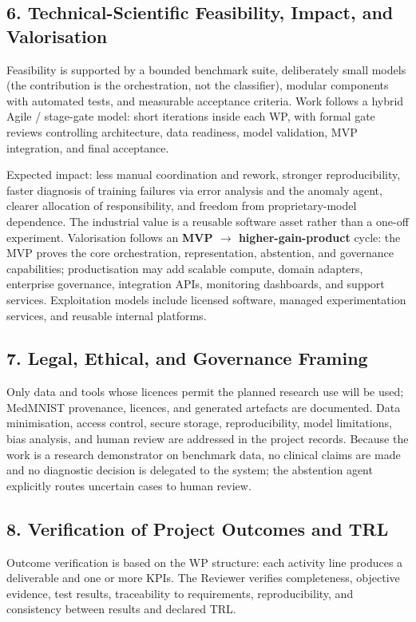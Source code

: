 \documentclass[11pt,a4paper]{article}
\begin{document}
\subsection*{6. Technical-Scientific Feasibility, Impact, and Valorisation}
Feasibility is supported by a bounded benchmark suite, deliberately small models (the contribution is the orchestration, not the classifier), modular components with automated tests, and measurable acceptance criteria. Work follows a hybrid Agile / stage-gate model: short iterations inside each WP, with formal gate reviews controlling architecture, data readiness, model validation, MVP integration, and final acceptance.

Expected impact: less manual coordination and rework, stronger reproducibility, faster diagnosis of training failures via error analysis and the anomaly agent, clearer allocation of responsibility, and freedom from proprietary-model dependence. The industrial value is a reusable software asset rather than a one-off experiment. Valorisation follows an \textbf{MVP $\rightarrow$ higher-gain-product} cycle: the MVP proves the core orchestration, representation, abstention, and governance capabilities; productisation may add scalable compute, domain adapters, enterprise governance, integration APIs, monitoring dashboards, and support services. Exploitation models include licensed software, managed experimentation services, and reusable internal platforms.

\subsection*{7. Legal, Ethical, and Governance Framing}
Only data and tools whose licences permit the planned research use will be used; MedMNIST provenance, licences, and generated artefacts are documented. Data minimisation, access control, secure storage, reproducibility, model limitations, bias analysis, and human review are addressed in the project records. Because the work is a research demonstrator on benchmark data, no clinical claims are made and no diagnostic decision is delegated to the system; the abstention agent explicitly routes uncertain cases to human review.

\subsection*{8. Verification of Project Outcomes and TRL}
Outcome verification is based on the WP structure: each activity line produces a deliverable and one or more KPIs. The Reviewer verifies completeness, objective evidence, test results, traceability to requirements, reproducibility, and consistency between results and declared TRL.
\end{document}
